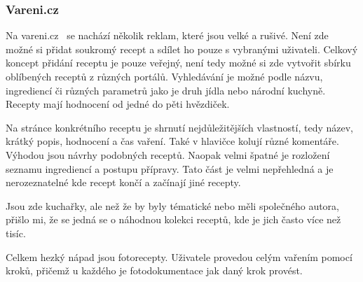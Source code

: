 \subsubsection{Vareni.cz}

Na vareni.cz~\cite{VareniCZ} se nachází několik reklam, které jsou velké a rušivé. Není zde možné si přidat soukromý recept a sdílet ho
pouze s vybranými uživateli. Celkový koncept přidání receptu je pouze veřejný, není tedy možné si zde vytvořit sbírku
oblíbených receptů z různých portálů. Vyhledávání je možné podle názvu, ingrediencí či různých parametrů jako je druh jídla
nebo národní kuchyně. Recepty mají hodnocení od jedné do pěti hvězdiček.

Na stránce konkrétního receptu je shrnutí nejdůležitějších vlastností, tedy název, krátký popis, hodnocení a čas vaření.
Také v hlavičce kolují různé komentáře. Výhodou jsou návrhy podobných receptů. Naopak velmi špatné je rozložení seznamu ingrediencí
a postupu přípravy. Tato část je velmi nepřehledná a je nerozeznatelné kde recept končí a začínají jiné recepty.

Jsou zde kuchařky, ale než že by byly tématické nebo měli společného autora, přišlo mi, že se jedná se o náhodnou kolekci receptů,
kde je jich často více než tisíc.

Celkem hezký nápad jsou fotorecepty. Uživatele provedou celým vařením pomocí kroků, přičemž u každého je fotodokumentace jak daný krok
provést.

